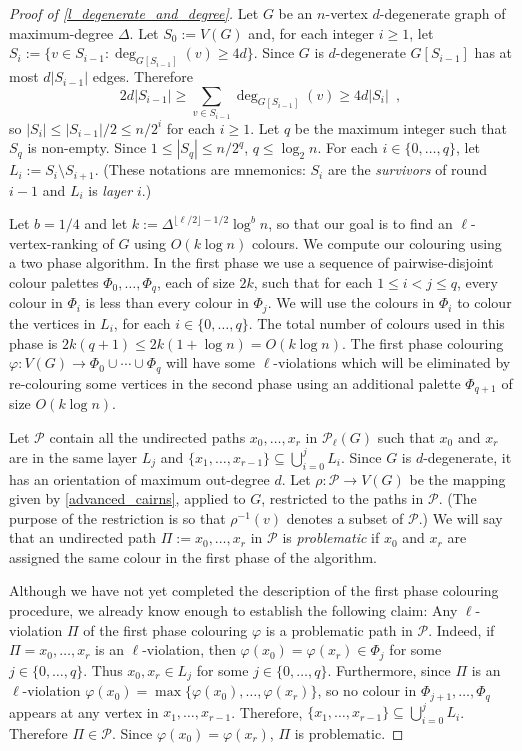 \documentclass{patmorin}
\newcommand{\defin}[1]{\emph{\color{brightmaroon}#1}}
\begin{document}
\begin{proof}[Proof of \cref{l_degenerate_and_degree}]
  Let $G$ be an $n$-vertex $d$-degenerate graph of maximum-degree $\Delta$.  Let $S_0:=V(G)$ and, for each integer $i\ge 1$, let $S_i:=\{v\in S_{i-1}:\deg_{G[S_{i-1}]}(v)\ge 4d\}$.  Since $G$ is $d$-degenerate $G[S_{i-1}]$ has at most $d|S_{i-1}|$ edges.  Therefore
  \[
    2d|S_{i-1}|\ge \sum_{v\in S_{i-1}} \deg_{G[S_{i-1}]}(v)\ge 4d|S_i| \enspace ,
  \]
  so $|S_i|\le |S_{i-1}|/2\le n/2^i$ for each $i\ge 1$.  Let $q$ be the maximum integer such that $S_q$ is non-empty.  Since $1\le |S_q|\le n/2^q$, $q\le \log_2 n$.  For each $i\in\{0,\ldots,q\}$, let $L_i:=S_i\setminus S_{i+1}$.  (These notations are mnemonics: $S_i$ are the \defin{survivors} of round $i-1$ and $L_i$ is \defin{layer} $i$.)

  Let $b=1/4$ and let $k:=\Delta^{\lfloor\ell/2\rfloor-1/2}\log^b n$, so that our goal is to find an $\ell$-vertex-ranking of $G$ using $O(k\log n)$ colours. We compute our colouring using a two phase algorithm. In the first phase we use a sequence of pairwise-disjoint colour palettes $\Phi_0,\ldots,\Phi_{q}$, each of size $2k$, such that for each $1\le i < j\le q$, every colour in $\Phi_i$ is less than every colour in $\Phi_j$.  We will use the colours in $\Phi_i$ to colour the vertices in $L_i$, for each $i\in\{0,\ldots,q\}$.  The total number of colours used in this phase is $2k(q+1)\le 2k(1+\log n)= O(k\log n)$.  The first phase colouring $\varphi:V(G)\to\Phi_0\cup\cdots\cup\Phi_q$ will have some $\ell$-violations which will be eliminated by re-colouring some vertices in the second phase using an additional palette $\Phi_{q+1}$ of size $O(k\log n)$.

  Let $\mathcal{P}$ contain all the undirected paths $x_0,\ldots,x_r$ in $\mathcal{P}_{\ell}(G)$ such that $x_0$ and $x_r$ are in the same layer $L_j$ and $\{x_1,\ldots,x_{r-1}\}\subseteq \bigcup_{i=0}^j L_i$.  Since $G$ is $d$-degenerate, it has an orientation of maximum out-degree $d$.  Let $\rho:\mathcal{P}\to V(G)$ be the mapping given by \cref{advanced_cairns}, applied to $G$, restricted to the paths in $\mathcal{P}$. (The purpose of the restriction is so that $\rho^{-1}(v)$ denotes a subset of $\mathcal{P}$.)  We will say that an undirected path $\Pi:=x_0,\ldots,x_r$ in $\mathcal{P}$ is \defin{problematic} if $x_0$ and $x_r$ are assigned the same colour in the first phase of the algorithm.

  Although we have not yet completed the description of the first phase colouring procedure, we already know enough to establish the following claim:  Any $\ell$-violation $\Pi$ of the first phase colouring $\varphi$ is a problematic path in $\mathcal{P}$.  Indeed, if $\Pi=x_0,\ldots,x_r$ is an $\ell$-violation, then $\varphi(x_0)=\varphi(x_r)\in \Phi_j$ for some $j\in\{0,\ldots,q\}$.  Thus $x_0,x_r\in L_j$ for some $j\in\{0,\ldots,q\}$.  Furthermore, since $\Pi$ is an $\ell$-violation $\varphi(x_0)=\max\{\varphi(x_0),\ldots,\varphi(x_r)\}$, so no colour in $\Phi_{j+1},\ldots,\Phi_q$ appears at any vertex in $x_1,\ldots,x_{r-1}$.  Therefore, $\{x_1,\ldots,x_{r-1}\}\subseteq \bigcup_{i=0}^j L_i$.  Therefore $\Pi\in\mathcal{P}$.  Since $\varphi(x_0)=\varphi(x_r)$, $\Pi$ is problematic.


\end{proof}
\end{document}
